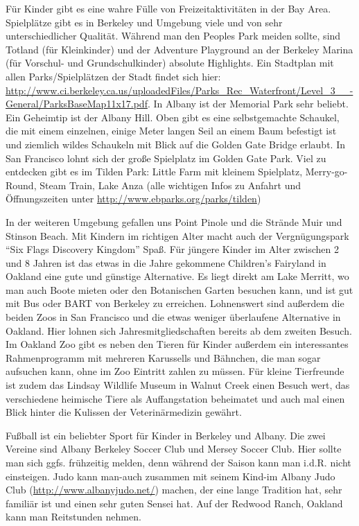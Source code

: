 \documentclass[a4paper]{scrreprt}
\begin{document}
Für Kinder gibt es eine wahre Fülle von Freizeitaktivitäten in der Bay Area. Spielplätze gibt es in Berkeley und Umgebung viele und von sehr unterschiedlicher Qualität. Während man den Peoples Park meiden sollte, sind Totland (für Kleinkinder) und der Adventure Playground an der Berkeley Marina (für Vorschul- und Grundschulkinder) absolute Highlights. 
Ein Stadtplan mit allen Parks/Spielplätzen der Stadt findet sich hier: \url{http://www.ci.berkeley.ca.us/uploadedFiles/Parks\_Rec\_Waterfront/Level\_3\_\_-General/ParksBaseMap11x17.pdf}.
In Albany ist der Memorial Park sehr beliebt. Ein Geheimtip ist der Albany Hill. Oben gibt es eine selbstgemachte Schaukel, die mit einem einzelnen, einige Meter langen Seil an einem Baum befestigt ist und ziemlich wildes Schaukeln mit Blick auf die Golden Gate Bridge erlaubt. In San Francisco lohnt sich der große Spielplatz im Golden Gate Park. Viel zu entdecken gibt es im Tilden Park:
Little Farm mit kleinem Spielplatz, Merry-go-Round, Steam Train, Lake Anza (alle wichtigen Infos zu Anfahrt und Öffnungszeiten unter \url{http://www.ebparks.org/parks/tilden})

In der weiteren Umgebung gefallen uns Point Pinole und die Strände Muir und Stinson Beach. Mit Kindern im richtigen Alter macht auch der Vergnügungspark "`Six Flags Discovery Kingdom"' Spaß.
Für jüngere Kinder im Alter zwischen 2 und 8 Jahren ist das etwas in die Jahre gekommene Children's Fairyland in Oakland eine gute und günstige Alternative. Es liegt direkt am Lake Merritt, wo man auch Boote mieten oder den Botanischen Garten besuchen kann, und ist gut mit Bus oder BART von Berkeley zu erreichen.
Lohnenswert sind außerdem die beiden Zoos in San Francisco und die etwas weniger überlaufene Alternative in Oakland. Hier lohnen sich Jahresmitgliedschaften bereits ab dem zweiten Besuch. Im Oakland Zoo gibt es neben den Tieren für Kinder außerdem ein interessantes Rahmenprogramm mit mehreren Karussells und Bähnchen, die man sogar aufsuchen kann, ohne im Zoo Eintritt zahlen zu müssen. Für kleine Tierfreunde ist zudem das Lindsay Wildlife Museum in Walnut Creek einen Besuch wert, das verschiedene heimische Tiere als Auffangstation beheimatet und auch mal einen Blick hinter die Kulissen der Veterinärmedizin gewährt.

Fußball ist ein beliebter Sport für Kinder in Berkeley und Albany. Die zwei Vereine sind Albany Berkeley Soccer Club und Mersey Soccer Club. Hier sollte man sich ggfs. frühzeitig melden, denn während der Saison kann man i.d.R. nicht einsteigen. Judo kann man-auch zusammen mit seinem Kind-im Albany Judo Club (\url{http://www.albanyjudo.net/}) machen, der eine lange Tradition hat, sehr familiär ist und einen sehr guten Sensei hat. Auf der Redwood Ranch, Oakland kann man Reitstunden nehmen.
\end{document}
